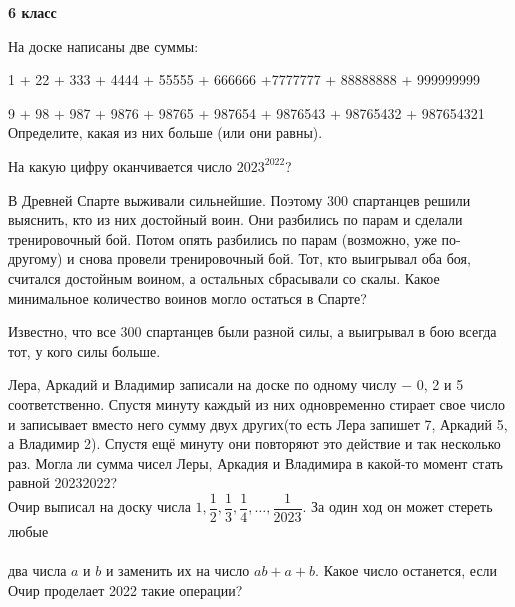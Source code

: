\centerline{\bf \Huge 6 класс}
 На доске написаны две суммы:\par
1 + 22 + 333 + 4444 + 55555 + 666666 +7777777 + 88888888 + 999999999 \par
9 + 98 + 987 + 9876 + 98765 + 987654 + 9876543 + 98765432 + 987654321 \\ 
Определите, какая из них больше (или они равны).

 На какую цифру оканчивается число $2023^{2022}$?

 В Древней Спарте выживали сильнейшие. Поэтому 300 спартанцев решили выяснить, кто из них достойный воин. Они разбились по парам и сделали тренировочный бой. Потом опять разбились по парам (возможно, уже по-другому) и снова провели тренировочный бой. Тот, кто выигрывал оба боя, считался достойным воином, а остальных сбрасывали со скалы. Какое минимальное количество воинов могло остаться в Спарте? \par
Известно, что все 300 спартанцев были разной силы, а выигрывал в бою всегда тот, у кого силы больше.


 Лера, Аркадий и Владимир записали на доске по одному числу $-$ 0, 2 и 5 соответственно. Спустя минуту каждый из них одновременно стирает свое число и записывает вместо него сумму двух других(то есть Лера запишет 7, Аркадий 5, а Владимир 2). Спустя ещё минуту они повторяют это действие и так несколько раз. Могла ли сумма чисел Леры, Аркадия и Владимира в какой-то момент стать равной 20232022?\\

 Очир выписал на доску числа $1, \dfrac{1}{2}, \dfrac{1}{3}, \dfrac{1}{4}, \dotsc, \dfrac{1}{2023}$. За один ход он может стереть любые 
\\
\\
два числа $a$ и $b$ и заменить их на число $ab+a+b$. Какое число останется, если Очир проделает 2022 такие операции?

